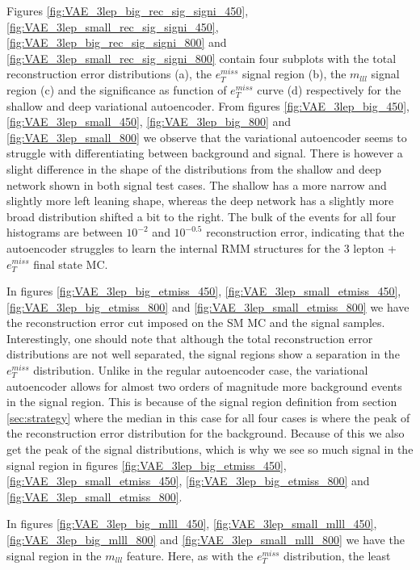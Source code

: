 Figures \ref{fig:VAE_3lep_big_rec_sig_signi_450}, \ref{fig:VAE_3lep_small_rec_sig_signi_450}, 
\ref{fig:VAE_3lep_big_rec_sig_signi_800} and \ref{fig:VAE_3lep_small_rec_sig_signi_800} contain four 
subplots with the total reconstruction error distributions (a), the $e_T^{miss}$ signal region (b), 
the $m_{lll}$ signal region (c) and the significance as function of $e_T^{miss}$ curve (d) respectively 
for the shallow and deep variational autoencoder. From figures \ref{fig:VAE_3lep_big_450}, \ref{fig:VAE_3lep_small_450},
\ref{fig:VAE_3lep_big_800} and \ref{fig:VAE_3lep_small_800} we observe that the variational 
autoencoder seems to struggle with differentiating between background and signal. 
There is however a slight difference in the shape of the distributions from the shallow and 
deep network shown in both signal test cases. The shallow has a more narrow and slightly more 
left leaning shape, whereas the deep network has a slightly more broad distribution shifted a 
bit to the right. The bulk of the events for all four histograms are between $10^{-2}$ and $10^{-0.5}$ 
reconstruction error, indicating that the autoencoder struggles to learn the internal RMM 
structures for the 3 lepton + $e_T^{miss}$ final state MC. \par 
In figures \ref{fig:VAE_3lep_big_etmiss_450}, \ref{fig:VAE_3lep_small_etmiss_450}, 
\ref{fig:VAE_3lep_big_etmiss_800} and  \ref{fig:VAE_3lep_small_etmiss_800} we have the 
reconstruction error cut imposed on the SM MC and the signal samples. Interestingly, one should 
note that although the total reconstruction error distributions are not well separated, the 
signal regions show a separation in the $e_T^{miss}$ distribution. Unlike in the regular autoencoder 
case, the variational autoencoder allows for almost two orders of magnitude more background 
events in the signal region. This is because of the signal region definition from section 
\ref{sec:strategy} where the median in this case for all four cases is where the peak of the 
reconstruction error distribution for the background. Because of this we also get the peak of 
the signal distributions, which is why we see so much signal in the signal region in figures 
\ref{fig:VAE_3lep_big_etmiss_450}, \ref{fig:VAE_3lep_small_etmiss_450}, 
\ref{fig:VAE_3lep_big_etmiss_800} and \ref{fig:VAE_3lep_small_etmiss_800}. \par 
In figures \ref{fig:VAE_3lep_big_mlll_450}, \ref{fig:VAE_3lep_small_mlll_450}, 
\ref{fig:VAE_3lep_big_mlll_800} and  \ref{fig:VAE_3lep_small_mlll_800} we have the signal 
region in the $m_{lll}$ feature. Here, as with the $e_T^{miss}$ distribution, the least 
